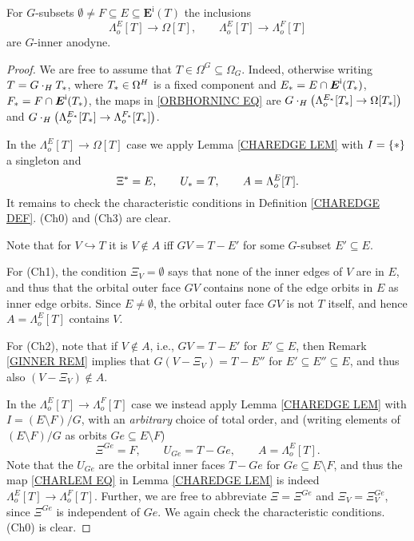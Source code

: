 \documentclass[a4paper,10pt
]{article}%
\begin{document}
\begin{proposition}\label{ORB_HORN_PROP}
	For $G$-subsets  
	$\emptyset \neq F \subseteq E \subseteq \boldsymbol{E}^{\mathsf{i}}(T)$
	the inclusions
\begin{equation}\label{ORBHORNINC EQ}
	\Lambda_o^{E}[T] \to \Omega[T],\qquad
	\Lambda_o^{E}[T] \to \Lambda_o^{F}[T]
\end{equation}
	are $G$-inner anodyne.
\end{proposition}

\begin{proof}
We are free to assume that $T \in \Omega^G \subseteq \Omega_G$. Indeed, otherwise writing $T = G \cdot_H T_{\**}$, where $T_{\**} \in \Omega^H$ is a fixed component and 
$E_{\**}=E \cap \boldsymbol{E}^{\mathsf{i}}(T_{\**})$, $F_{\**} = F \cap \boldsymbol{E}^{\mathsf{i}}(T_{\**})$,
the maps in \eqref{ORBHORNINC EQ} are
$G \cdot_H 
\left( \Lambda_o^{E_{\**}}[T_{\**}] \to \Omega[T_{\**}]\right)$
and
$G \cdot_H 
\left( \Lambda_o^{E_{\**}}[T_{\**}] \to \Lambda_o^{F_{\**}}[T_{\**}]\right)$.

In the $\Lambda_o^{E}[T] \to \Omega[T]$ case we apply
Lemma \ref{CHAREDGE LEM} with $I = \{\**\}$ a singleton and
\[
	\Xi^{\**} = E, \qquad 
	U_{\**} = T,\qquad
	A=\Lambda_o^{E}[T].
\]
It remains to check the characteristic conditions in Definition \ref{CHAREDGE DEF}.
(Ch0) and (Ch3) are clear.

Note that for $V\hookrightarrow T$ it is $V \not \in A$ iff 
$GV = T-E'$ for some $G$-subset
$E' \subseteq E$.

For (Ch1), the condition $\Xi_{V} = \emptyset$
says that none of the inner edges of $V$ are in $E$,
and thus that the orbital outer face $G V$ contains none of the edge orbits in $E$ as inner edge orbits. Since $E \neq \emptyset$, the orbital outer face $GV$ is not $T$ itself, 
and hence $A=\Lambda_o^{E}[T]$ contains $V$.

For (Ch2), note that if $V \not \in A$, i.e., 
$GV = T - E'$ for $E' \subseteq E$, then Remark \ref{GINNER REM} implies that
$G(V-\Xi_V) = T - E''$ for $E'\subseteq E'' \subseteq E$,
and thus also $(V-\Xi_V) \not \in A$.


In the $\Lambda_o^{E}[T] \to \Lambda_o^{F}[T]$ case 
we instead apply Lemma \ref{CHAREDGE LEM} with $I = (E \setminus F)/G$, with an 
\textit{arbitrary} choice of total order, and 
(writing elements of $(E \setminus F)/G$ as orbits $Ge \subseteq E \setminus F$)
\[
	\Xi^{Ge} = F, \qquad 
	U_{G e}= T - Ge, \qquad
	A=\Lambda_o^{E}[T].
\]
Note that the $U_{Ge}$ are the orbital inner faces $T - Ge$ for $Ge \subseteq E \setminus F$, and thus the map
\eqref{CHARLEM EQ}
in Lemma \ref{CHAREDGE LEM} is indeed $\Lambda_o^{E}[T] \to \Lambda_o^{F}[T]$.
Further, we are free to abbreviate $\Xi = \Xi^{Ge}$ and $\Xi_V = \Xi^{Ge}_V$, since
$\Xi^{Ge}$ is independent of $G e$.
We again check the characteristic conditions. (Ch0) is clear.


\end{proof}
\end{document}
